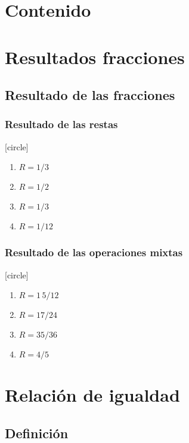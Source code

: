 \maketitle
\fontsize{14}{14}\selectfont
{}
\section*{Contenido}
\section{Resultados fracciones}

\subsection{Resultado de las fracciones}

\begin{frame}
\frametitle{Resultado de las restas}
[circle]
\begin{enumerate}[<+->]
\item $R=1/3$
\item $R=1/2$
\item $R=1/3$
\item $R=1/12$
\end{enumerate}
\end{frame}
\begin{frame}
\frametitle{Resultado de las operaciones mixtas}
[circle]
\begin{enumerate}[<+->]
\item $R=1 \, 5/12$
\item $R=17/24$
\item $R=35/36$
\item $R=4/5$
\end{enumerate}
\end{frame}

\section{Relación de igualdad}
\subsection{Definición}

